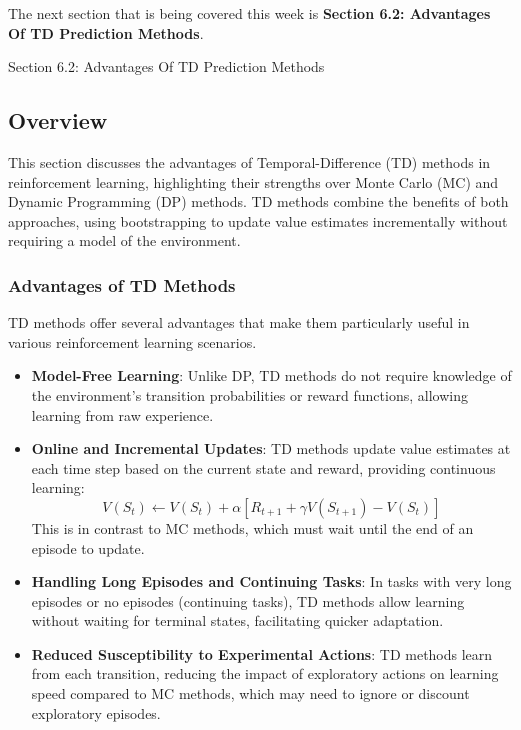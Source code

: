The next section that is being covered this week is \textbf{Section 6.2: Advantages Of TD Prediction Methods}.

\begin{notes}{Section 6.2: Advantages Of TD Prediction Methods}
    \subsection*{Overview}

    This section discusses the advantages of Temporal-Difference (TD) methods in reinforcement learning, highlighting their strengths over Monte Carlo (MC) and Dynamic Programming (DP) methods. TD methods 
    combine the benefits of both approaches, using bootstrapping to update value estimates incrementally without requiring a model of the environment.
    
    \subsubsection*{Advantages of TD Methods}
    
    TD methods offer several advantages that make them particularly useful in various reinforcement learning scenarios.
    
    \begin{highlight}
    
        \begin{itemize}
            \item \textbf{Model-Free Learning}: Unlike DP, TD methods do not require knowledge of the environment's transition probabilities or reward functions, allowing learning from raw experience.
            \item \textbf{Online and Incremental Updates}: TD methods update value estimates at each time step based on the current state and reward, providing continuous learning:
            \[
            V(S_t) \leftarrow V(S_t) + \alpha [R_{t+1} + \gamma V(S_{t+1}) - V(S_t)]
            \]
            This is in contrast to MC methods, which must wait until the end of an episode to update.
            \item \textbf{Handling Long Episodes and Continuing Tasks}: In tasks with very long episodes or no episodes (continuing tasks), TD methods allow learning without waiting for terminal states, 
            facilitating quicker adaptation.
            \item \textbf{Reduced Susceptibility to Experimental Actions}: TD methods learn from each transition, reducing the impact of exploratory actions on learning speed compared to MC methods, which may 
            need to ignore or discount exploratory episodes.
        \end{itemize}
    

\end{highlight}
\end{notes}
